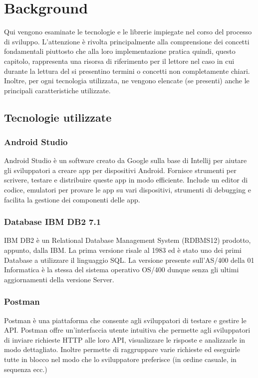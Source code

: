 \chapter{Background}\label{ch:2}
Qui vengono esaminate le tecnologie e le librerie impiegate nel corso del processo di sviluppo. L'attenzione è rivolta principalmente alla comprensione dei concetti fondamentali piuttosto che alla loro implementazione pratica quindi, questo capitolo, rappresenta una risorsa di riferimento per il lettore nel caso in cui durante la lettura del  si presentino termini o concetti non completamente chiari. Inoltre, per ogni tecnologia utilizzata, ne vengono elencate (se presenti) anche le principali caratteristiche utilizzate.

\section{Tecnologie utilizzate}

\subsection{Android Studio}
Android Studio \cite{AStudio} è un software creato da Google sulla base di Intellij \cite{intellij} per aiutare gli sviluppatori a creare app per dispositivi Android. Fornisce strumenti per scrivere, testare e distribuire queste app in modo efficiente. Include un editor di codice, emulatori per provare le app su vari dispositivi, strumenti di debugging e facilita la gestione dei componenti delle app.

\subsection{Database IBM DB2 7.1}
IBM DB2 \cite{DB2} è un Relational Database Management System (RDBMS12) prodotto, appunto, dalla IBM. La prima versione risale al 1983 ed è stato uno dei primi Database a utilizzare il linguaggio SQL. La versione presente sull’AS/400 della 01 Informatica è la stessa del sistema operativo OS/400 dunque senza gli ultimi aggiornamenti della versione Server.

\subsection{Postman}
Postman \cite{postman} è una piattaforma che consente agli sviluppatori di testare e gestire le API. Postman offre un'interfaccia utente intuitiva che permette agli sviluppatori di inviare richieste HTTP alle loro API, visualizzare le risposte e analizzarle in modo dettagliato. Inoltre permette di raggruppare varie richieste ed eseguirle tutte in blocco nel modo che lo sviluppatore preferisce (in ordine casuale, in sequenza ecc.)

